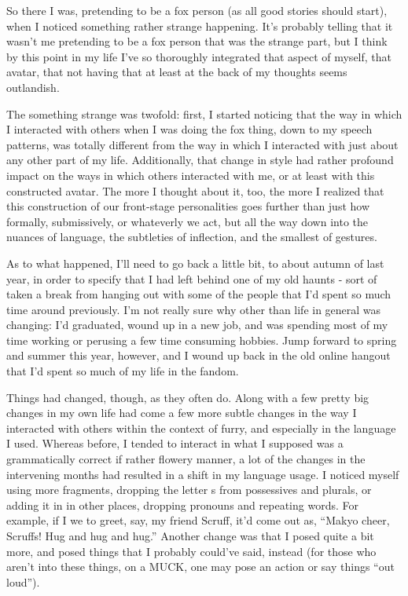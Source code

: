 
So there I was, pretending to be a fox person (as all good stories should start), when I noticed something rather strange happening. It's probably telling that it wasn't me pretending to be a fox person that was the strange part, but I think by this point in my life I've so thoroughly integrated that aspect of myself, that avatar, that not having that at least at the back of my thoughts seems outlandish.

The something strange was twofold: first, I started noticing that the way in which I interacted with others when I was doing the fox thing, down to my speech patterns, was totally different from the way in which I interacted with just about any other part of my life. Additionally, that change in style had rather profound impact on the ways in which others interacted with me, or at least with this constructed avatar. The more I thought about it, too, the more I realized that this construction of our front-stage personalities goes further than just how formally, submissively, or whateverly we act, but all the way down into the nuances of language, the subtleties of inflection, and the smallest of gestures.

As to what happened, I'll need to go back a little bit, to about autumn of last year, in order to specify that I had left behind one of my old haunts - sort of taken a break from hanging out with some of the people that I'd spent so much time around previously. I'm not really sure why other than life in general was changing: I'd graduated, wound up in a new job, and was spending most of my time working or perusing a few time consuming hobbies. Jump forward to spring and summer this year, however, and I wound up back in the old online hangout that I'd spent so much of my life in the fandom.

Things had changed, though, as they often do. Along with a few pretty big changes in my own life had come a few more subtle changes in the way I interacted with others within the context of furry, and especially in the language I used. Whereas before, I tended to interact in what I supposed was a grammatically correct if rather flowery manner, a lot of the changes in the intervening months had resulted in a shift in my language usage. I noticed myself using more fragments, dropping the letter s from possessives and plurals, or adding it in in other places, dropping pronouns and repeating words. For example, if I we to greet, say, my friend Scruff, it'd come out as, ``Makyo cheer, Scruffs! Hug and hug and hug.''  Another change was that I posed quite a bit more, and posed things that I probably could've said, instead (for those who aren't into these things, on a MUCK, one may pose an action or say things ``out loud'').

